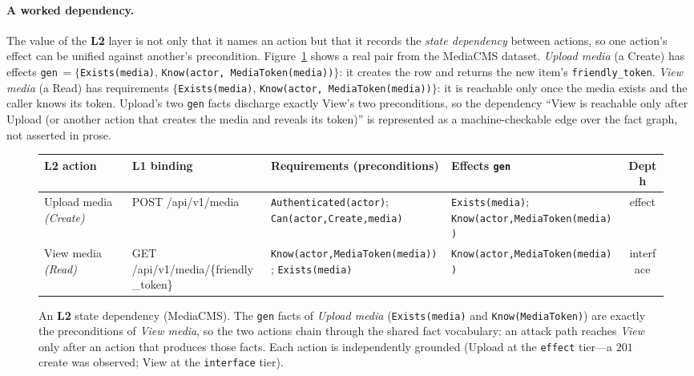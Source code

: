 \documentclass[11pt,a4paper]{article}
\newcommand{\cd}[1]{\lstinline[basicstyle=\ttfamily\small]|#1|}
\renewcommand{\L}[1]{\textbf{L#1}}
\begin{document}
\paragraph{A worked dependency.} The value of the \L2 layer is not only that it names an
action but that it records the \emph{state dependency} between actions, so one action's effect
can be unified against another's precondition. Figure~\ref{fig:l2dep} shows a real pair from
the MediaCMS dataset. \emph{Upload media} (a Create) has effects
\cd{gen}\,$=\{$\cd{Exists(media)}, \cd{Know(actor, MediaToken(media))}$\}$: it creates the row
and returns the new item's \cd{friendly_token}. \emph{View media} (a Read) has requirements
$\{$\cd{Exists(media)}, \cd{Know(actor, MediaToken(media))}$\}$: it is reachable only once the
media exists and the caller knows its token. Upload's two \cd{gen} facts discharge exactly
View's two preconditions, so the dependency ``View is reachable only after Upload (or another
action that creates the media and reveals its token)'' is represented as a machine-checkable
edge over the fact graph, not asserted in prose.

\begin{figure}[ht]\centering\footnotesize
\begin{tabularx}{\textwidth}{@{}l l >{\raggedright\arraybackslash}X >{\raggedright\arraybackslash}X c@{}}
\toprule
\textbf{\L2 action} & \textbf{\L1 binding} & \textbf{Requirements (preconditions)} &
\textbf{Effects \cd{gen}} & \textbf{Depth}\\
\midrule
Upload media \emph{(Create)} & \ttfamily POST /api/v1/media &
\cd{Authenticated(actor)}; \cd{Can(actor,Create,media)} &
\cd{Exists(media)}; \cd{Know(actor,MediaToken(media))} & effect\\[2pt]
View media \emph{(Read)} & \ttfamily GET /api/v1/media/\{friendly\_token\} &
\cd{Know(actor,MediaToken(media))}; \cd{Exists(media)} &
\cd{Know(actor,MediaToken(media))} & interface\\
\bottomrule
\end{tabularx}
\caption{An \L2 state dependency (MediaCMS). The \cd{gen} facts of \emph{Upload media}
(\cd{Exists(media)} and \cd{Know(MediaToken)}) are exactly the preconditions of \emph{View
media}, so the two actions chain through the shared fact vocabulary: an attack path reaches
\emph{View} only after an action that produces those facts. Each action is independently
grounded (Upload at the \cd{effect} tier---a $201$ create was observed; View at the
\cd{interface} tier).}
\label{fig:l2dep}
\end{figure}
\end{document}
